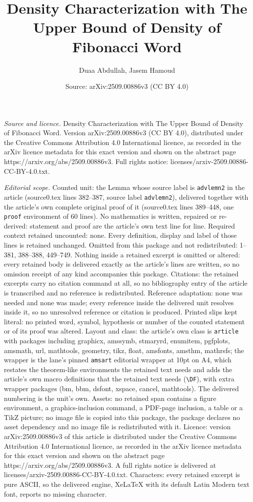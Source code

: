 \documentclass[10pt,a4paper]{amsart}
\title[Density Characterization with The Upper Bound of Density of ]{Density Characterization with The Upper Bound of Density of Fibonacci Word}
\author{Duaa Abdullah, Jasem Hamoud}
\date{Source: arXiv:2509.00886v3 (CC BY 4.0)}
\begin{document}
\maketitle

\noindent\emph{Source and licence.} Density Characterization with The Upper Bound of Density of Fibonacci Word. Version arXiv:2509.00886v3 (CC BY 4.0), distributed under the Creative Commons Attribution 4.0 International licence, as recorded in the arXiv licence metadata for this exact version and shown on the abstract page https://arxiv.org/abs/2509.00886v3. Full rights notice: licenses/arxiv-2509.00886-CC-BY-4.0.txt.\par\smallskip

\noindent\textit{Editorial scope.} Counted unit: the Lemma whose source label is \texttt{advlemn2} in the article (source0.tex lines 382--387, source label \texttt{advlemn2}), delivered together with the article's own complete original proof of it (source0.tex lines 389--448, one \texttt{proof} environment of 60 lines). No mathematics is written, repaired or re-derived: statement and proof are the article's own text line for line. Required context retained uncounted: none. Every definition, display and label of those lines is retained unchanged. Omitted from this package and not redistributed: 1--381, 388--388, 449--749. Nothing inside a retained excerpt is omitted or altered: every retained body is delivered exactly as the article's lines are written, so no omission receipt of any kind accompanies this package. Citations: the retained excerpts carry no citation command at all, so no bibliography entry of the article is transcribed and no reference is redistributed. Reference adaptation: none was needed and none was made; every reference inside the delivered unit resolves inside it, so no unresolved reference or citation is produced. Printed slips kept literal: no printed word, symbol, hypothesis or number of the counted statement or of its proof was altered. Layout and class: the article's own class is \texttt{article} with packages including graphicx, amssymb, stmaryrd, enumitem, pgfplots, amsmath, url, mathtools, geometry, tikz, float, amsfonts, amsthm, mathrsfs; the wrapper is the lane's pinned \texttt{amsart} editorial wrapper at 10pt on A4, which restates the theorem-like environments the retained text needs and adds the article's own macro definitions that the retained text needs (\texttt{\textbackslash DF}), with extra wrapper packages (bm, bbm, dsfont, xspace, cancel, mathtools). The delivered numbering is the unit's own. Assets: no retained span contains a figure environment, a graphics-inclusion command, a PDF-page inclusion, a table or a TikZ picture; no image file is copied into this package, the package declares no asset dependency and no image file is redistributed with it. Licence: version arXiv:2509.00886v3 of this article is distributed under the Creative Commons Attribution 4.0 International licence, as recorded in the arXiv licence metadata for this exact version and shown on the abstract page https://arxiv.org/abs/2509.00886v3. A full rights notice is delivered at licenses/arxiv-2509.00886-CC-BY-4.0.txt. Characters: every retained excerpt is pure ASCII, so the delivered engine, XeLaTeX with its default Latin Modern text font, reports no missing character.
\end{document}
